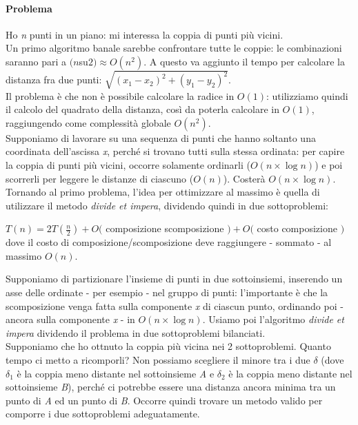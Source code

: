 \paragraph{Problema}
Ho \textit{n} punti in un piano: mi interessa la coppia di punti più vicini. \\
Un primo algoritmo banale sarebbe confrontare tutte le coppie: le combinazioni saranno pari a $(n$su$2) \approx O(n^2)$. A questo va aggiunto il tempo per calcolare la distanza fra due punti: $\sqrt{(x_1 - x_2)^2 + (y_1 - y_2)^2}$. \\
Il problema è che non è possibile calcolare la radice in $O(1)$: utilizziamo quindi il calcolo del quadrato della distanza, così da poterla calcolare in $O(1)$, raggiungendo come complessità globale $O(n^2)$. \\
Supponiamo di lavorare su una sequenza di punti che hanno soltanto una coordinata dell'ascissa \textit{x}, perché si trovano tutti sulla stessa ordinata: per capire la coppia di punti più vicini, occorre solamente ordinarli ($O(n \times \log{n})$) e poi scorrerli per leggere le distanze di ciascuno ($O(n)$). Costerà $O(n \times \log{n})$. \\
Tornando al primo problema, l'idea per ottimizzare al massimo è quella di utilizzare il metodo \textit{divide et impera}, dividendo quindi in due sottoproblemi:
\begin{center}
	$T(n) = 2T(\frac{n}{2}) + O($ composizione scomposizione $) + O($ costo composizione $)$ \\
	dove il costo di composizione/scomposizione deve raggiungere - sommato - al massimo $O(n)$.
\end{center}
Supponiamo di partizionare l'insieme di punti in due sottoinsiemi, inserendo un asse delle ordinate - per esempio - nel gruppo di punti: l'importante è che la scomposizione venga fatta sulla componente \textit{x} di ciascun punto, ordinando poi - ancora sulla componente \textit{x} - in $O(n \times \log{n})$. Usiamo poi l'algoritmo \textit{divide et impera} dividendo il problema in due sottoproblemi bilanciati. \\
Supponiamo che ho ottnuto la coppia più vicina nei 2 sottoproblemi. Quanto tempo ci metto a ricomporli? Non possiamo scegliere il minore tra i due $\delta$ (dove $\delta_1$ è la coppia meno distante nel sottoinsieme \textit{A} e $\delta_2$ è la coppia meno distante nel sottoinsieme \textit{B}), perché ci potrebbe essere una distanza ancora minima tra un punto di \textit{A} ed un punto di \textit{B}. Occorre quindi trovare un metodo valido per comporre i due sottoproblemi adeguatamente.